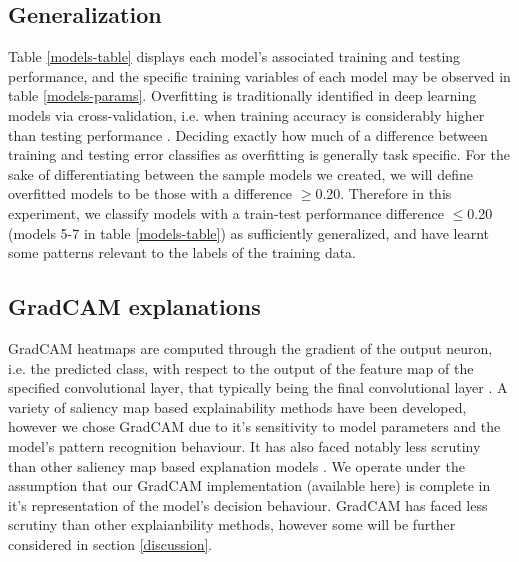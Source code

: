 \documentclass[conference]{IEEEtran}
\begin{document}
\subsection{Generalization}
Table \ref{models-table} displays each model's associated training and testing performance, and the specific training variables of each model may be observed in table \ref{models-params}. Overfitting is traditionally identified in deep learning models via cross-validation, i.e. when training accuracy is considerably higher than testing performance \cite{theory}. Deciding exactly how much of a difference between training and testing error classifies as overfitting is generally task specific. For the sake of differentiating between the sample models we created, we will define overfitted models to be those with a difference $\geq$0.20. Therefore in this experiment, we classify models with a train-test performance difference $\leq$0.20 (models 5-7 in table \ref{models-table}) as sufficiently generalized, and have learnt some patterns relevant to the labels of the training data. 


% 

\subsection{GradCAM explanations}

GradCAM heatmaps are computed through the gradient of the output neuron, i.e. the predicted class, with respect to the output of the feature map of the specified convolutional layer, that typically being the final convolutional layer \cite{gradcam}. A variety of saliency map based explainability methods have been developed, however we chose GradCAM due to it's sensitivity to model parameters and the model's pattern recognition behaviour. It has also faced notably less scrutiny than other saliency map based explanation models \cite{sanity}. We operate under the assumption that our GradCAM implementation (available here) is complete in it’s representation of the model’s decision behaviour. GradCAM has faced less scrutiny than other explaianbility methods, however some will be further considered in section \ref{discussion}. \\
\end{document}
